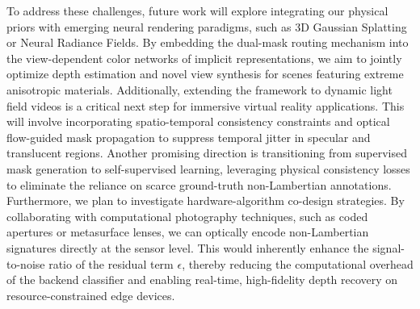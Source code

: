 To address these challenges, future work will explore integrating our physical priors with emerging neural rendering paradigms, such as 3D Gaussian Splatting or Neural Radiance Fields. By embedding the dual-mask routing mechanism into the view-dependent color networks of implicit representations, we aim to jointly optimize depth estimation and novel view synthesis for scenes featuring extreme anisotropic materials. Additionally, extending the framework to dynamic light field videos is a critical next step for immersive virtual reality applications. This will involve incorporating spatio-temporal consistency constraints and optical flow-guided mask propagation to suppress temporal jitter in specular and translucent regions. Another promising direction is transitioning from supervised mask generation to self-supervised learning, leveraging physical consistency losses to eliminate the reliance on scarce ground-truth non-Lambertian annotations. Furthermore, we plan to investigate hardware-algorithm co-design strategies. By collaborating with computational photography techniques, such as coded apertures or metasurface lenses, we can optically encode non-Lambertian signatures directly at the sensor level. This would inherently enhance the signal-to-noise ratio of the residual term $\epsilon$, thereby reducing the computational overhead of the backend classifier and enabling real-time, high-fidelity depth recovery on resource-constrained edge devices.
